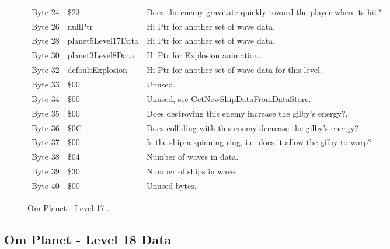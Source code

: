 \begin{figure}[H]
{\begin{adjustbox}{width=12cm}
\begin{tabular}{lll}
 Byte 24 & \$23                & Does the enemy gravitate quickly toward the player when its hit?   \\
 Byte 26 & nullPtr            & Hi Ptr for another set of wave data.                               \\
 Byte 28 & planet5Level17Data & Hi Ptr for another set of wave data.                               \\
 Byte 30 & planet3Level8Data  & Hi Ptr for Explosion animation.                                    \\
 Byte 32 & defaultExplosion   & Hi Ptr for another set of wave data for this level.                \\
 Byte 33 & \$00                & Unused.                                                            \\
 Byte 34 & \$00                & Unused, see GetNewShipDataFromDataStore.                           \\
 Byte 35 & \$00                & Does destroying this enemy increase the gilby's energy?.           \\
 Byte 36 & \$0C                & Does colliding with this enemy decrease the gilby's energy?        \\
 Byte 37 & \$00                & Is the ship a spinning ring, i.e. does it allow the gilby to warp? \\
 Byte 38 & \$04                & Number of waves in data.                                           \\
 Byte 39 & \$30                & Number of ships in wave.                                           \\
 Byte 40 & \$00                & Unused bytes.                                                      \\
\bottomrule
\end{tabular}

  \end{adjustbox}

  }\caption*{Om Planet - Level 17
.}
\end{figure}

\clearpage
\subsection{Om Planet - Level 18 Data}

